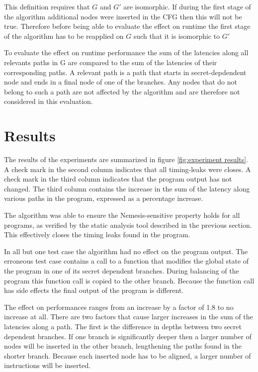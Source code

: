 This definition requires that $G$ and $G'$ are isomorphic. If during the first stage of the algorithm additional nodes were inserted in the CFG
then this will not be true. Therefore before being able to evaluate the effect on runtime the first stage of the algorithm has to be reapplied on $G$ such 
that it is isomorphic to $G'$

To evaluate the effect on runtime performance the sum of the latencies along all relevants paths in G are compared to the sum of the latencies of their corresponding paths. A relevant path is a path that starts in secret-depdendent node and ends in a final node of one of the branches. Any nodes that do not belong to such a path 
are not affected by the algorithm and are therefore not considered in this evaluation. 

    
\section{Results}

The results of the experiments are summarized in figure \ref{fig:experiment results}.
A check mark in the second column indicates that all timing-leaks were closes. 
A check mark in the third column indicates that the program output has not changed. 
The third column contains the increase in the sum of the latency along various paths in the program, expressed as a percentage increase.

The algorithm was able to ensure the Nemesis-sensitive property holds for all programs, as verified by the static analysis tool described in the previous section. This effectively closes the 
timing leaks found in the program. 

In all but one test case the algorithm had no effect on the program output. 
The erroneous test case contains a call to a function that modifies the global state of the program in one of its secret dependent branches. 
During balancing of the program this function call is copied to the other branch. 
Because the function call has side effects the final output of the program is different. 

The effect on performances ranges from an increase by a factor of 1.8 to no increase at all. 
There are two factors that cause larger increases in the sum of the latencies along a path. The first is the difference in depths between two secret dependent branches. 
If one branch is significantly deeper then a larger number of nodes will be inserted in the other branch, lengthening the paths found in the shorter branch. 
Because each inserted node has to be aligned, a larger number of instructions will be inserted. 

